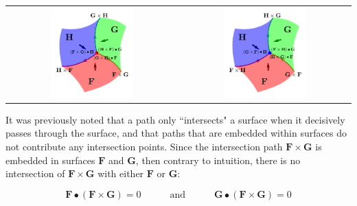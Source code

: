 \begin{tabular}{cc}
\parbox{0.5\textwidth}{
\includegraphics[width = 0.5\textwidth]{Intersections/Surface-surface_intersections/surface_surface_surface_intersections}
} & \parbox{0.5\textwidth}{
\includegraphics[width = 0.5\textwidth]{Intersections/Surface-surface_intersections/surface_surface_surface_intersections_reversed}
}
\end{tabular}

It was previously noted that a path only ``intersects" a surface when it decisively passes through the surface, and that paths that are embedded within surfaces do not contribute any intersection points. Since the intersection path \(\mathbf{F} \times \mathbf{G}\) is embedded in surfaces \(\mathbf{F}\) and \(\mathbf{G}\), then contrary to intuition, there is no intersection of \(\mathbf{F} \times \mathbf{G}\) with either \(\mathbf{F}\) or \(\mathbf{G}\):
\begin{thm}
\[\mathbf{F} \bullet (\mathbf{F} \times \mathbf{G}) = 0 \quad\quad\quad\text{and}\quad\quad\quad \mathbf{G} \bullet (\mathbf{F} \times \mathbf{G}) = 0\]  
\end{thm}




